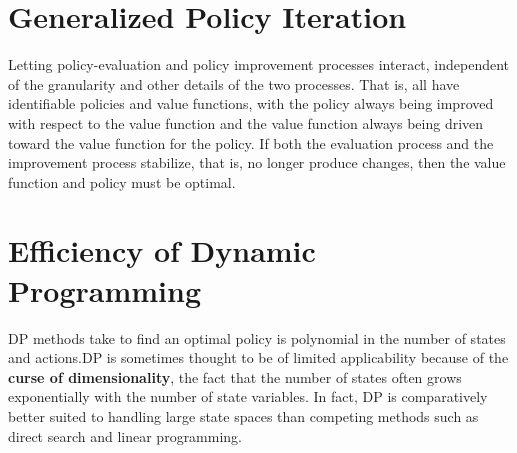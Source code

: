 \section{Generalized Policy Iteration}
Letting policy-evaluation and policy improvement processes interact, independent of the granularity
and other details of the two processes. That is, all have identifiable policies and value functions, with the policy always being improved with respect to the value function and the value
function always being driven toward the value function for the policy. If both the evaluation process and the improvement process stabilize, that is, no longer produce changes, then the value function and policy must be optimal.

\section{Efficiency of Dynamic Programming}
DP methods take to find an optimal policy is polynomial in the number of states and actions.DP is sometimes thought to be of limited applicability because of the \textbf{curse of dimensionality}, the fact that the number of states often grows exponentially with the number of state variables. In fact, DP is comparatively better
suited to handling large state spaces than competing methods such as direct search and linear programming.
